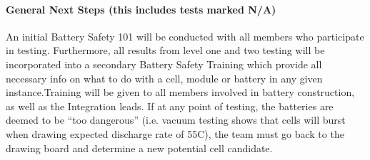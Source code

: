 \documentclass[main.tex]{subfiles}
\begin{document}
    \paragraph{General Next Steps (this includes tests marked N/A)}
    An initial Battery Safety 101 will be conducted with all members who participate in testing. Furthermore, all results from level one and two testing will be incorporated into a secondary Battery Safety Training which provide all necessary info on what to do with a cell, module or battery in any given instance.Training will be given to all members involved in battery construction, as well as the Integration leads. If at any point of testing, the batteries are deemed to be “too dangerous” (i.e. vacuum testing shows that cells will burst when drawing expected discharge rate of 55C), the team must go back to the drawing board and determine a new potential cell candidate.
\end{document}
